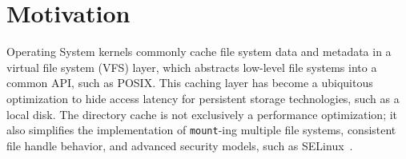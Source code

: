\section{Motivation}
\label{sec:dcache:motivation}

Operating System kernels commonly cache file system data and metadata in 
a virtual file system (VFS) layer, which abstracts low-level file systems into a common API, 
such as POSIX.  
This caching layer has become a ubiquitous optimization
to hide access latency for 
persistent storage technologies, such as a local disk.
The directory cache is not exclusively a performance optimization; it also simplifies 
the implementation of {\tt mount}-ing multiple file systems, 
consistent file handle behavior,
and advanced security 
models, such as SELinux~\citep{selinux}.







